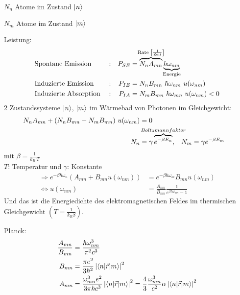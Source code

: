 	$N_n$ Atome im Zustand $\ket{n}$
	
	$N_m$ Atome im Zustand $\ket{m}$
	
	Leistung:
		\begin{align*}
			&\text{Spontane Emission} & &:  
			&P_{SE} &= 
			\overbrace{N_n A_{mn}}^{\mathclap{\text{Rate~} \left[\frac{1}{\text{Zeit}}\right]}} 
			\underbrace{\hbar \omega_{nm}}_{\mathclap{\text{Energie}}}\\
			&\text{Induzierte Emission} & &:
			&P_{IE} &= N_n B_{mn} ~\hbar \omega_{nm} ~u(\omega_{nm})\\
			&\text{Induzierte Absorption} & &:
			&P_{IA} &= N_m B_{mn} ~\hbar \omega_{mn} ~u(\omega_{nm}) < 0
		\end{align*}
	2 Zustandssysteme $\ket{n}$, $\ket{m}$ im Wärmebad von Photonen im Gleichgewicht: 
		\begin{align*}
			N_n A_{mn} + (N_n B_{mn} - N_m B_{mn}) ~u(\omega_{nm}) &= 0 \\
			N_n &= \gamma \overbrace{e^{- \beta E_n}}^{\mathclap{Boltzmannfaktor}} 
			,& N_m &= \gamma e^{-\beta E_m}
		\end{align*}
	mit $\beta = \frac{1}{k_B ~T}$ \\
	$T$: Temperatur und $\gamma$: Konstante
		\begin{align*}
			\Rightarrow 
			e^{-\beta \hbar \omega_n} \left( A_{mn} + B_{mn} u(\omega_{nm}) \right)
			&= e^{-\beta \hbar \omega_{m}} B_{mn} u(\omega_{nm}) \\
			\Leftrightarrow u(\omega_{nm}) &= \frac{A_{mn}}{B_{mn}} \frac{1}{e^{\beta \hbar \omega_{mn}} - 1}
		\end{align*}
	Und das ist die Energiedichte des elektromagnetischen Feldes im thermischen Gleichgewicht $\left(T=\frac{1}{k_B \beta}\right)$.
	
	Planck:
		\begin{align*}
			\frac{A_{mn}}{B_{mn}} &= \frac{\hbar \omega_{nm}^3}{\pi^2 c^3} \\
			B_{mn} &= \frac{\pi e^2}{3 \hbar^2} \left|\braket{n | \vec{r} | m}\right|^2 \\
			A_{mn} &= \frac{\omega_{mn}^3 e^2}{3 \pi \hbar c^3} \left|\braket{n | \vec{r} | m}\right|^2 
			= \frac{4}{3} \frac{\omega_{mn}^3}{c^2} \alpha \left|\braket{n | \vec{r} | m}\right|^2 
		\end{align*}
